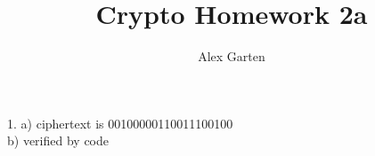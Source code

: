 \documentclass{article}
\begin{document}
    
    \title{Crypto Homework 2a}
    \author{Alex Garten}
    \date{}
    
    1. a) ciphertext is 00100000110011100100 \\
    b) verified by code
    
    
    
\end{document}
